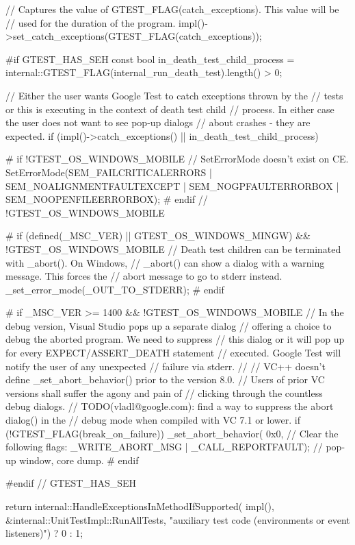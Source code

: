 \begin{DoxyCode}
                  {
  // Captures the value of GTEST_FLAG(catch_exceptions).  This value will be
  // used for the duration of the program.
  impl()->set_catch_exceptions(GTEST_FLAG(catch_exceptions));

#if GTEST_HAS_SEH
  const bool in_death_test_child_process =
      internal::GTEST_FLAG(internal_run_death_test).length() > 0;

  // Either the user wants Google Test to catch exceptions thrown by the
  // tests or this is executing in the context of death test child
  // process. In either case the user does not want to see pop-up dialogs
  // about crashes - they are expected.
  if (impl()->catch_exceptions() || in_death_test_child_process) {

# if !GTEST_OS_WINDOWS_MOBILE
    // SetErrorMode doesn't exist on CE.
    SetErrorMode(SEM_FAILCRITICALERRORS | SEM_NOALIGNMENTFAULTEXCEPT |
                 SEM_NOGPFAULTERRORBOX | SEM_NOOPENFILEERRORBOX);
# endif  // !GTEST_OS_WINDOWS_MOBILE

# if (defined(_MSC_VER) || GTEST_OS_WINDOWS_MINGW) && !GTEST_OS_WINDOWS_MOBILE
    // Death test children can be terminated with _abort().  On Windows,
    // _abort() can show a dialog with a warning message.  This forces the
    // abort message to go to stderr instead.
    _set_error_mode(_OUT_TO_STDERR);
# endif

# if _MSC_VER >= 1400 && !GTEST_OS_WINDOWS_MOBILE
    // In the debug version, Visual Studio pops up a separate dialog
    // offering a choice to debug the aborted program. We need to suppress
    // this dialog or it will pop up for every EXPECT/ASSERT_DEATH statement
    // executed. Google Test will notify the user of any unexpected
    // failure via stderr.
    //
    // VC++ doesn't define _set_abort_behavior() prior to the version 8.0.
    // Users of prior VC versions shall suffer the agony and pain of
    // clicking through the countless debug dialogs.
    // TODO(vladl@google.com): find a way to suppress the abort dialog() in the
    // debug mode when compiled with VC 7.1 or lower.
    if (!GTEST_FLAG(break_on_failure))
      _set_abort_behavior(
          0x0,                                    // Clear the following flags:
          _WRITE_ABORT_MSG | _CALL_REPORTFAULT);  // pop-up window, core dump.
# endif

  }
#endif  // GTEST_HAS_SEH

  return internal::HandleExceptionsInMethodIfSupported(
      impl(),
      &internal::UnitTestImpl::RunAllTests,
      "auxiliary test code (environments or event listeners)") ? 0 : 1;
}
\end{DoxyCode}
